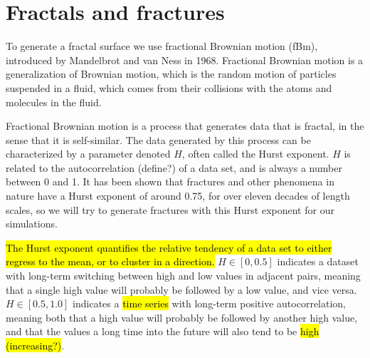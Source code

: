 \chapter{Fractals and fractures}
%
%
To generate a fractal surface we use fractional Brownian motion (fBm), introduced by Mandelbrot and van Ness in 1968\cite{mandelbrot1968fractional}. Fractional Brownian motion is a generalization of Brownian motion, which is the random motion of particles suspended in a fluid, which comes from their collisions with the atoms and molecules in the fluid. 

Fractional Brownian motion is a process that generates data that is fractal, in the sense that it is self-similar. The data generated by this process can be characterized by a parameter denoted $H$, often called the Hurst exponent. $H$ is related to the autocorrelation (define?) of a data set, and is always a number between 0 and 1. It has been shown that fractures and other phenomena in nature have a Hurst exponent of around 0.75, for over eleven decades of length scales\cite{renard2013hurst}, so we will try to generate fractures with this Hurst exponent for our simulations.

\hl{The Hurst exponent quantifies the relative tendency of a data set to either regress to the mean, or to cluster in a direction.} $H\in[0,0.5]$ indicates a dataset with long-term switching between high and low values in adjacent pairs, meaning that a single high value will probably be followed by a low value, and vice versa. $H\in[0.5,1.0]$ indicates a \hl{time series} with long-term positive autocorrelation, meaning both that a high value will probably be followed by another high value, and that the values a long time into the future will also tend to be \hl{high (increasing?)}.

